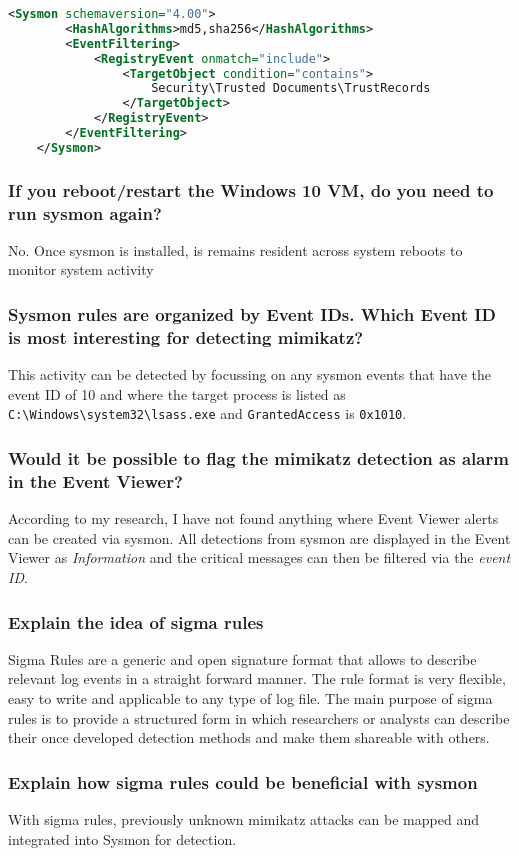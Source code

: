 \begin{lstlisting}[language=XML]
    <Sysmon schemaversion="4.00">
        <HashAlgorithms>md5,sha256</HashAlgorithms>
        <EventFiltering>
            <RegistryEvent onmatch="include">
                <TargetObject condition="contains">
                    Security\Trusted Documents\TrustRecords
                </TargetObject>
            </RegistryEvent>
        </EventFiltering>
    </Sysmon>
\end{lstlisting}

\subsubsection{If you reboot/restart the Windows 10 VM, do you need to run sysmon again?}
No. Once sysmon is installed, is remains resident across system reboots to monitor system activity

\subsubsection{Sysmon rules are organized by Event IDs. Which Event ID is most interesting for detecting mimikatz?}
This activity can be detected by focussing on any sysmon events that have the event ID of 10 and where the target process is listed as \lstinline|C:\Windows\system32\lsass.exe| and \lstinline|GrantedAccess| is \lstinline|0x1010|.

\subsubsection{Would it be possible to flag the mimikatz detection as alarm in the Event Viewer?}
According to my research, I have not found anything where Event Viewer alerts can be created via sysmon. All detections from sysmon are displayed in the Event Viewer as \textit{Information}\color{black} and the critical messages can then be filtered via the \textit{event ID}.

\subsubsection{Explain the idea of sigma rules}
Sigma Rules are a generic and open signature format that allows to describe relevant log events in a straight forward manner. The rule format is very flexible, easy to write and applicable to any type of log file. The main purpose of sigma rules is to provide a structured form in which researchers or analysts can describe their once developed detection methods and make them shareable with others.

\subsubsection{Explain how sigma rules could be beneficial with sysmon}
With sigma rules, previously unknown mimikatz attacks can be mapped and integrated into Sysmon for detection.
